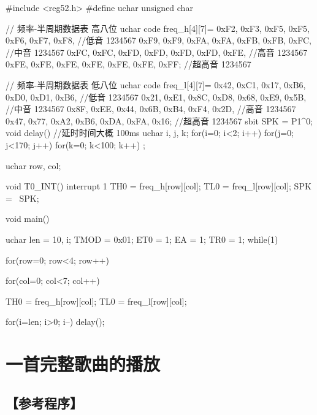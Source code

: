 \documentclass{swfulabreport}
\begin{document}
\begin{ccode}
#include <reg52.h>
#define uchar unsigned char

// 频率-半周期数据表 高八位
uchar code freq_h[4][7]={
   {0xF2, 0xF3, 0xF5, 0xF5, 0xF6, 0xF7, 0xF8},  //低音 1234567
   {0xF9, 0xF9, 0xFA, 0xFA, 0xFB, 0xFB, 0xFC},  //中音 1234567
   {0xFC, 0xFC, 0xFD, 0xFD, 0xFD, 0xFD, 0xFE},  //高音 1234567
   {0xFE, 0xFE, 0xFE, 0xFE, 0xFE, 0xFE, 0xFF}}; //超高音 1234567

// 频率-半周期数据表 低八位
uchar code freq_l[4][7]={
   {0x42, 0xC1, 0x17, 0xB6, 0xD0, 0xD1, 0xB6},  //低音 1234567
   {0x21, 0xE1, 0x8C, 0xD8, 0x68, 0xE9, 0x5B},  //中音 1234567
   {0x8F, 0xEE, 0x44, 0x6B, 0xB4, 0xF4, 0x2D},  //高音 1234567
   {0x47, 0x77, 0xA2, 0xB6, 0xDA, 0xFA, 0x16}}; //超高音 1234567
sbit SPK = P1^0;
void delay() //延时时间大概 100ms
{
   uchar i, j, k;
   for(i=0; i<2; i++)
   {
      for(j=0; j<170; j++)
      {
         for(k=0; k<100; k++)
         {
            ;
         }
      }
   }
}

uchar row, col;

void T0_INT() interrupt 1
{
   TH0 = freq_h[row][col];
   TL0 = freq_l[row][col];
   SPK = ~SPK;
}

void main()
{
   uchar len = 10, i;
   TMOD = 0x01;
   ET0 = 1;
   EA = 1;
   TR0 = 1;
   while(1)
   {
      for(row=0; row<4; row++)
      {
         for(col=0; col<7; col++)
         {
            TH0 = freq_h[row][col];
            TL0 = freq_l[row][col];

            for(i=len; i>0; i--)
            {
                delay();
            }
         }
      }
   }
}
\end{ccode}


\section{一首完整歌曲的播放}

\subsection{【参考程序】}
\end{document}
